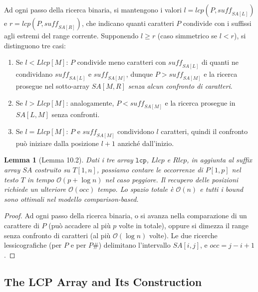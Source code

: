 \documentclass[12pt, a4paper, oneside]{book}
\theoremstyle{plain}
\newtheorem{lemma}[teorema]{Lemma}
\theoremstyle{definition}
\theoremstyle{remark}
\newcommand{\OO}[1]{\mathcal{O}\!\left(#1\right)}
\begin{document}
Ad ogni passo della ricerca binaria, si mantengono i valori $l = lcp(P, \mathit{suff}_{SA[L]})$ e $r = lcp(P, \mathit{suff}_{SA[R]})$, che indicano quanti caratteri $P$ condivide con i suffissi agli estremi del range corrente. Supponendo $l \geq r$ (caso simmetrico se $l < r$), si distinguono tre casi:

\begin{enumerate}
  \item Se $l < \mathit{Llcp}[M]$: $P$ condivide meno caratteri con $\mathit{suff}_{SA[L]}$ di quanti ne condividano $\mathit{suff}_{SA[L]}$ e $\mathit{suff}_{SA[M]}$, dunque $P > \mathit{suff}_{SA[M]}$ e la ricerca prosegue nel sotto-array $SA[M, R]$ \emph{senza alcun confronto di caratteri}.
  \item Se $l > \mathit{Llcp}[M]$: analogamente, $P < \mathit{suff}_{SA[M]}$ e la ricerca prosegue in $SA[L, M]$ senza confronti.
  \item Se $l = \mathit{Llcp}[M]$: $P$ e $\mathit{suff}_{SA[M]}$ condividono $l$ caratteri, quindi il confronto può iniziare dalla posizione $l+1$ anziché dall'inizio.
\end{enumerate}

\begin{lemma}[Lemma 10.2]
\label{lem:substr-optimal}
Dati i tre array $\mathtt{lcp}$, $\mathit{Llcp}$ e $\mathit{Rlcp}$, in aggiunta al suffix array $SA$ costruito su $T[1,n]$, possiamo contare le occorrenze di $P[1,p]$ nel testo $T$ in tempo $\OO{p + \log n}$ nel caso peggiore. Il recupero delle posizioni richiede un ulteriore $\OO{\mathit{occ}}$ tempo. Lo spazio totale è $\OO{n}$ e tutti i bound sono ottimali nel modello comparison-based.
\end{lemma}

\begin{proof}
Ad ogni passo della ricerca binaria, o si avanza nella comparazione di un carattere di $P$ (può accadere al più $p$ volte in totale), oppure si dimezza il range senza confronto di caratteri (al più $\OO{\log n}$ volte). Le due ricerche lessicografiche (per $P$ e per $P\#$) delimitano l'intervallo $SA[i,j]$, e $\mathit{occ} = j - i + 1$.
\end{proof}

\subsection{The LCP Array and Its Construction}
\label{subsec:kasai}
\end{document}
